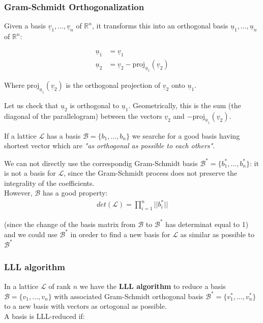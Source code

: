 \subsubsection{Gram-Schmidt Orthogonalization}

Given a basis $\underline{v}_1, \dots, \underline{v}_n$ of $\mathbb{R}^n$, it transforms this into an orthogonal basis $\underline{u}_1, \dots, \underline{u}_n$ of $\mathbb{R}^n$:

\begin{align*}
\underline{u}_1 &= \underline{v}_1 \\
\underline{u}_2 &= \underline{v}_2 - \text{proj}_{\underline{u}_1}(\underline{v}_2)
\end{align*}

\noindent
Where $\text{proj}_{\underline{u}_1}(\underline{v}_2)$ is the orthogonal projection of $\underline{v}_2$ onto $\underline{u}_1$.
\bigskip

\noindent
Let us check that $\underline{u}_2$ is orthogonal to $\underline{u}_1$. Geometrically, this is the sum (the diagonal of the parallelogram) between the vectors $\underline{v}_2$ and $-\text{proj}_{\underline{u}_1}(\underline{v}_2)$.

\vspace{1 cm}

\noindent
If a lattice $\mathcal{L}$ has a basis $\mathcal{B} = \{b_1, \dots, b_n\}$ we searche for a good basis having shortest vector which are \textit{"as orthogonal as possible to each others"}.
\medskip

\noindent
We can not directly use the correspondig Gram-Schmidt basis $\mathcal{B}^*= \{b_1^{*}, \dots, b_n^{*}\}$: it is not a basis for $\mathcal{L}$, since the Gram-Schmidt process does not preserve the integrality of the coefficients.\\
However, $\mathcal{B}$ has a good property:
\begin{align*}
    det(\mathcal{L}) = \prod_{i=1}^n ||b_i^{*}||
\end{align*}

\noindent
(since the change of the basis matrix from $\mathcal{B}$ to $\mathcal{B}^*$ has determinat equal to 1) and we could use $\mathcal{B}^*$ in oreder to find a new basis for $\mathcal{L}$ as similar as possible to $\mathcal{B}^*$

\subsubsection{LLL algorithm}
In a lattice $\mathcal{L}$ of rank $n$ we have the \textbf{LLL algorithm} to reduce a basis $\mathcal{B} = \{v_1, \dots, v_n\}$ with associated Gram-Schmidt orthogonal basis $\mathcal{B}^* = \{v_1^{*}, \dots, v_n^{*}\}$ to a new basis with vectors as ortogonal as possible.\\
A basis is LLL-reduced if:

